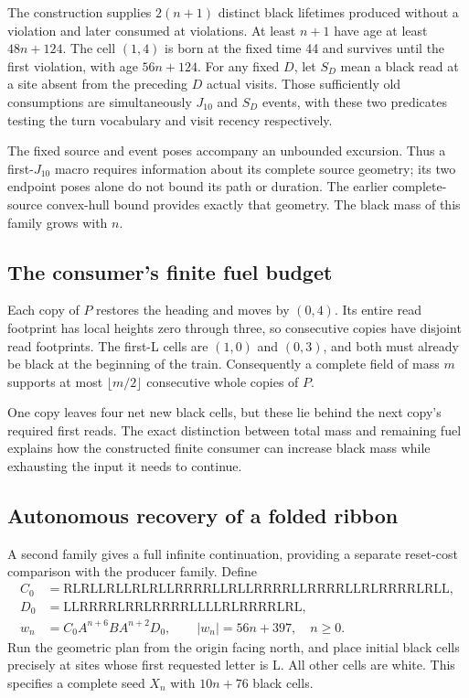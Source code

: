 The construction supplies \(2(n+1)\) distinct black lifetimes produced
without a violation and later consumed at violations. At least \(n+1\)
have age at least \(48n+124\). The cell \((1,4)\) is born at the fixed
time 44 and survives until the first violation, with age \(56n+124\).
For any fixed $D$, let $S_D$ mean a black read at a site absent from the
preceding $D$ actual visits. Those sufficiently old consumptions are simultaneously
\(J_{10}\) and \(S_D\) events, with these two predicates testing the
turn vocabulary and visit recency respectively.

The fixed source and event poses accompany an unbounded excursion. Thus a
first-\(J_{10}\) macro requires information about its complete source
geometry; its two endpoint poses alone do not bound its path or duration.
The earlier complete-source convex-hull bound provides exactly that geometry.
The black mass of this family grows with \(n\).

\subsection{The consumer's finite fuel budget}
Each copy of \(P\) restores the heading and moves by \((0,4)\). Its entire
read footprint has local heights zero through three, so consecutive copies
have disjoint read footprints. The first-L cells are \((1,0)\) and
\((0,3)\), and both must already be black at the beginning of the train.
Consequently a complete field of mass \(m\) supports at most
\(\lfloor m/2\rfloor\) consecutive whole copies of \(P\).

One copy leaves four net new black cells, but these lie behind the next
copy's required first reads. The exact distinction between total mass and
remaining fuel explains how the constructed finite consumer can increase
black mass while exhausting the input it needs to continue.



\subsection{Autonomous recovery of a folded ribbon}\label{app:folded-ribbon}
A second family gives a full infinite continuation, providing a separate
reset-cost comparison with the producer family. Define
\[
\begin{split}
 C_0&=\mathrm{RLRLLRLLRLRLLRRRRLLRLLRRRRLLRRRRLLRLRRRRLRLL},\\
 D_0&=\mathrm{LLRRRRLRRLRRRRLLLLRLRRRRLRL},\\
 w_n&=C_0A^{n+6}BA^{n+2}D_0,\qquad |w_n|=56n+397,
 \quad n\ge0.
\end{split}
\]
Run the geometric plan from the origin facing north, and place initial
black cells precisely at sites whose first requested letter is L. All
other cells are white. This specifies a complete seed \(X_n\) with
\(10n+76\) black cells.

